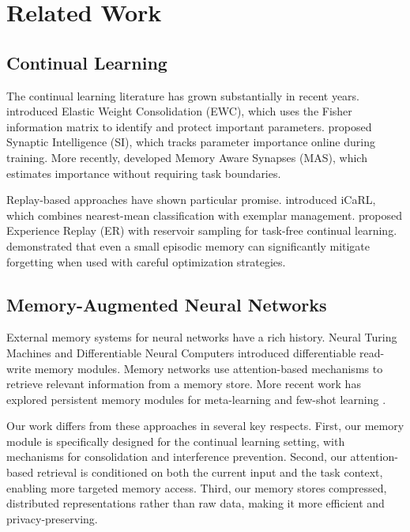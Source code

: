 \documentclass[11pt]{article}
\begin{document}
\section{Related Work}
\label{sec:related}

\subsection{Continual Learning}

The continual learning literature has grown substantially in recent years. \citet{kirkpatrick2017overcoming} introduced Elastic Weight Consolidation (EWC), which uses the Fisher information matrix to identify and protect important parameters. \citet{zenke2017continual} proposed Synaptic Intelligence (SI), which tracks parameter importance online during training. More recently, \citet{aljundi2018memory} developed Memory Aware Synapses (MAS), which estimates importance without requiring task boundaries.

Replay-based approaches have shown particular promise. \citet{rebuffi2017icarl} introduced iCaRL, which combines nearest-mean classification with exemplar management. \citet{rolnick2019experience} proposed Experience Replay (ER) with reservoir sampling for task-free continual learning. \citet{chaudhry2019tiny} demonstrated that even a small episodic memory can significantly mitigate forgetting when used with careful optimization strategies.

\subsection{Memory-Augmented Neural Networks}

External memory systems for neural networks have a rich history. Neural Turing Machines \citep{graves2014neural} and Differentiable Neural Computers \citep{graves2016hybrid} introduced differentiable read-write memory modules. Memory networks \citep{weston2014memory, sukhbaatar2015end} use attention-based mechanisms to retrieve relevant information from a memory store. More recent work has explored persistent memory modules for meta-learning \citep{santoro2016meta, munkhdalai2017meta} and few-shot learning \citep{kaiser2017learning}.

Our work differs from these approaches in several key respects. First, our memory module is specifically designed for the continual learning setting, with mechanisms for consolidation and interference prevention. Second, our attention-based retrieval is conditioned on both the current input and the task context, enabling more targeted memory access. Third, our memory stores compressed, distributed representations rather than raw data, making it more efficient and privacy-preserving.
\end{document}
